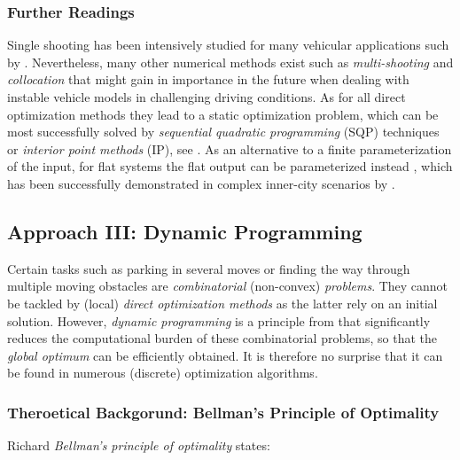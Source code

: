 \subsubsection{Further Readings}\label{S:57.3.2.3}

Single shooting has been intensively studied for many vehicular applications such by \cite{kelly2003reactive,Falcone2007,howard2007optimal,Yoon2009,gerdts2009generating, park2009obstacle}. 
Nevertheless, many other numerical methods exist such as \emph{multi-shooting} \cite{bock-direct-multiple-shooting} and \emph{collocation} \cite{hargraves1987direct} that might gain in importance in the future when dealing with instable vehicle models in challenging driving conditions. 
As for all direct optimization methods they lead to a static optimization problem, which can be most successfully solved by \emph{sequential quadratic programming} (SQP) techniques or \emph{interior point methods} (IP), see \cite{nocedal2006numerical}.
As an alternative to a finite parameterization of the input, for flat systems \cite{rouchon1993flatness1}
the flat output can be parameterized instead \cite{kang2012online}, which has been successfully demonstrated in complex inner-city scenarios by \cite{ziegler2014trajectory}.

\subsection{Approach III: Dynamic Programming}\label{S:57.3.3}
Certain tasks such as parking in several moves or finding the way through multiple moving obstacles are \emph{combinatorial} (non-convex) \emph{problems}. They cannot be tackled by (local) \textit{direct optimization methods} as the latter rely on an initial solution. However, \emph{dynamic programming} is a principle from \cite{bellman_DP} 
that significantly reduces the computational burden of these combinatorial problems, so that the \emph{global optimum} can be efficiently obtained. It is therefore no surprise that it can be found in numerous (discrete) optimization algorithms.


\subsubsection{Theroetical Backgorund: Bellman’s Principle of Optimality}\label{S:57.3.3.1}
Richard \emph{Bellman’s principle of optimality} states:

